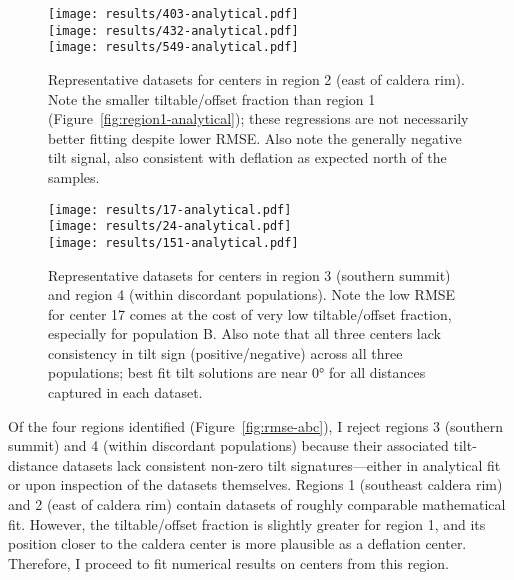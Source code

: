 \begin{figure}
    \vspace{-15pt}
    \texttt{[image: results/403-analytical.pdf]}\\
    \texttt{[image: results/432-analytical.pdf]}\\
    \texttt{[image: results/549-analytical.pdf]}%
    \caption[East of caldera rim: analytical fit]{Representative datasets for centers in region 2 (east of caldera rim). Note the smaller tiltable/offset fraction than region 1 (Figure~\ref{fig:region1-analytical}); these regressions are not necessarily better fitting despite lower \acs{RMSE}. Also note the generally negative tilt signal, also consistent with deflation as expected north of the samples.}
    \label{fig:region2-analytical}
\end{figure}

\begin{figure}
    \vspace{-12pt}
    \texttt{[image: results/17-analytical.pdf]}\\
    \texttt{[image: results/24-analytical.pdf]}\\
    \texttt{[image: results/151-analytical.pdf]}%
    \caption[Southern regions: analytical fit]{Representative datasets for centers in region 3 (southern summit) and region 4 (within discordant populations). Note the low \acs{RMSE} for center 17 comes at the cost of very low tiltable/offset fraction, especially for population B. Also note that all three centers lack consistency in  tilt sign (positive/negative) across all three populations; best fit tilt solutions are near \ang{0} for all distances captured in each dataset.}
    \label{fig:region34-analytical}
\end{figure}

Of the four regions identified (Figure~\ref{fig:rmse-abc}), I reject regions 3 (southern summit) and 4 (within discordant populations) because their associated tilt-distance datasets lack consistent non-zero tilt signatures---either in analytical fit or upon inspection of the datasets themselves. Regions 1 (southeast caldera rim) and 2 (east of caldera rim) contain datasets of roughly comparable mathematical fit. However, the tiltable/offset fraction is slightly greater for region 1, and its position closer to the caldera center is more plausible as a deflation center. Therefore, I proceed to fit numerical results on centers from this region.


